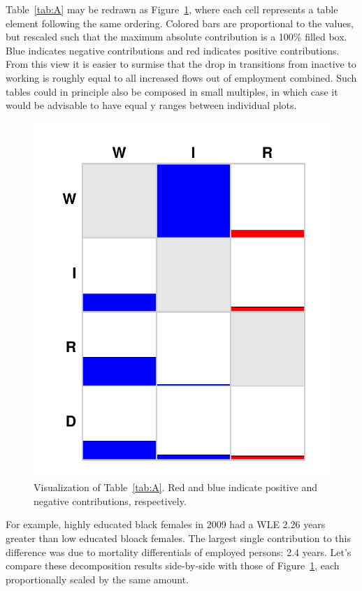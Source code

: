 \documentclass{article}
\begin{document}
Table~\ref{tab:A} may be redrawn as Figure~\ref{fig:deca}, where each cell
represents a table element following the same ordering. Colored bars are
proportional to the values, but rescaled such that the maximum absolute
contribution is a 100\% filled box. Blue indicates negative contributions and
red indicates positive contributions. From this view it is easier to surmise
that the drop in transitions from inactive to working is roughly equal to all
increased flows out of employment combined. Such tables could in principle also
be composed in small multiples, in which case it would be advisable to have
equal y ranges between individual plots.

\begin{figure}[ht!]
\begin{center}
\caption{Visualization of Table~\ref{tab:A}. Red and blue indicate positive and
negative contributions, respectively. }
\label{fig:deca}
\includegraphics[scale=.5]{Figures/decA.pdf}
\end{center}
\end{figure}

\FloatBarrier
For example, highly educated black females in 2009 had a WLE 2.26 years greater
than low educated bloack females. The largest single contribution to this
difference was due to mortality differentials of employed persons: 2.4 years.
Let's compare these decomposition results side-by-side with those of
Figure~\ref{fig:deca}, each proportionally scaled by the same amount.
\end{document}

